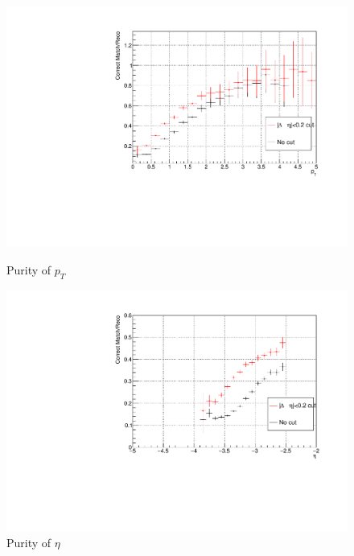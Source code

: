 \begin{figure}[htbp]
\begin{minipage}{0.45\textwidth}
                    \end{minipage}
                    \\
                    \vspace{1em}
                    \begin{minipage}{0.45\textwidth}
                    \centering
                    \includegraphics[width=\textwidth]{fig/3_5_6_purity_pt.pdf}
                        \caption{Purity of $p_T$}
                    \end{minipage}
                    \hfill
                    \begin{minipage}{0.45\textwidth}
                        \centering
                        \includegraphics[width=\textwidth]{fig/3_5_6_purity_eta.pdf}
                    \caption{Purity of $\eta$} 
                    \end{minipage}

\end{figure}
